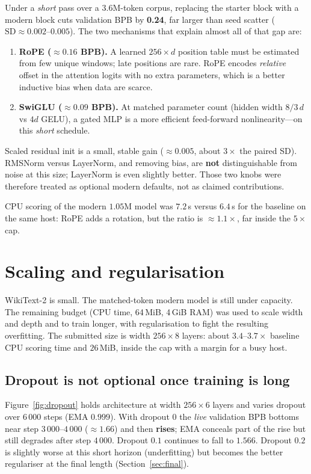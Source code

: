 \documentclass[11pt,a4paper]{article}
\begin{document}
Under a \emph{short} pass over a $3.6$M-token corpus, replacing the starter block with a modern block cuts validation BPB by \textbf{0.24}, far larger than seed scatter ($\mathrm{SD}\approx 0.002$--$0.005$). The two mechanisms that explain almost all of that gap are:
\begin{enumerate}
  \item \textbf{RoPE ($\approx 0.16$ BPB).} A learned $256\times d$ position table must be estimated from few unique windows; late positions are rare. RoPE encodes \emph{relative} offset in the attention logits with no extra parameters, which is a better inductive bias when data are scarce.
  \item \textbf{SwiGLU ($\approx 0.09$ BPB).} At matched parameter count (hidden width $8/3\,d$ vs $4d$ GELU), a gated MLP is a more efficient feed-forward nonlinearity---on this \emph{short} schedule.
\end{enumerate}
Scaled residual init is a small, stable gain ($\approx 0.005$, about $3\times$ the paired SD). RMSNorm versus LayerNorm, and removing bias, are \textbf{not} distinguishable from noise at this size; LayerNorm is even slightly better. Those two knobs were therefore treated as optional modern defaults, not as claimed contributions.

CPU scoring of the modern $1.05$M model was $7.2$\,s versus $6.4$\,s for the baseline on the same host: RoPE adds a rotation, but the ratio is $\approx 1.1\times$, far inside the $5\times$ cap.

\section{Scaling and regularisation}

WikiText-2 is small. The matched-token modern model is still under capacity. The remaining budget (CPU time, 64\,MiB, 4\,GiB RAM) was used to scale width and depth and to train longer, with regularisation to fight the resulting overfitting. The submitted size is width $256\times 8$ layers: about $3.4$--$3.7\times$ baseline CPU scoring time and $26$\,MiB, inside the cap with a margin for a busy host.

\subsection{Dropout is not optional once training is long}

Figure~\ref{fig:dropout} holds architecture at width $256\times 6$ layers and varies dropout over 6\,000 steps (EMA $0.999$). With dropout $0$ the \emph{live} validation BPB bottoms near step $3\,000$--$4\,000$ ($\approx 1.66$) and then \textbf{rises}; EMA conceals part of the rise but still degrades after step $4\,000$. Dropout $0.1$ continues to fall to $1.566$. Dropout $0.2$ is slightly worse at this short horizon (underfitting) but becomes the better regulariser at the final length (Section~\ref{sec:final}).
\end{document}
